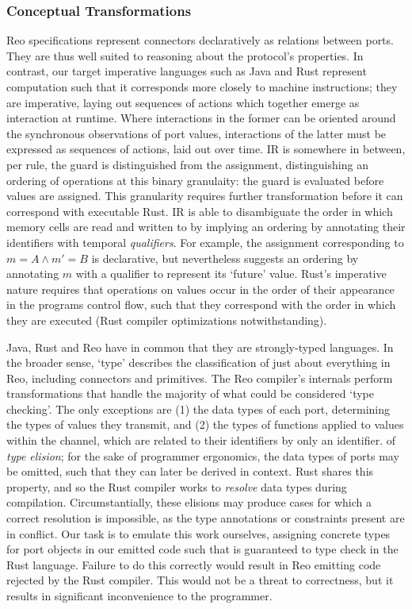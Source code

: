 \subsubsection{Conceptual Transformations}
Reo specifications represent connectors declaratively as relations between ports. They are thus well suited to reasoning about the protocol's properties. In contrast, our target imperative languages such as Java and Rust represent computation such that it corresponds more closely to machine instructions; they are imperative, laying out sequences of actions which together emerge as interaction at runtime. Where interactions in the former can be oriented around the synchronous observations of port values, interactions of the latter must be expressed as sequences of actions, laid out over time. IR is somewhere in between, per rule, the guard is distinguished from the assignment, distinguishing an ordering of operations at this binary granulaity: the guard is evaluated before values are assigned. This granularity requires further transformation before it can correspond with executable Rust. IR is able to disambiguate the order in which memory cells are read and written to by implying an ordering by annotating their identifiers with temporal \textit{qualifiers}. For example, the assignment corresponding to $m=A\wedge{}m'=B$ is declarative, but nevertheless suggests an ordering by annotating $m$ with a qualifier to represent its `future' value. Rust's imperative nature requires that operations on values occur in the order of their appearance in the programs control flow, such that they correspond with the order in which they are executed (Rust compiler optimizations notwithstanding).

Java, Rust and Reo have in common that they are strongly-typed languages. In the broader sense, `type' describes the classification of just about everything in Reo, including connectors and primitives. The Reo compiler's internals perform transformations that handle the majority of what could be considered `type checking'. The only exceptions are (1) the data types of each port, determining the types of values they transmit, and (2) the types of functions applied to values within the channel, which are  related to their identifiers by only an identifier. 
of \textit{type elision}; for the sake of programmer ergonomics, the data types of ports may be omitted, such that they can later be derived in context. Rust shares this property, and so the Rust compiler works to \textit{resolve} data types during compilation. Circumstantially, these elisions may produce cases for which a correct resolution is impossible, as the type annotations or constraints present are in conflict. Our task is to emulate this work ourselves, assigning concrete types for port objects in our emitted code such that is guaranteed to type check in the Rust language. Failure to do this correctly would result in Reo emitting code rejected by the Rust compiler. This would not be a threat to correctness, but it results in significant inconvenience to the programmer.

